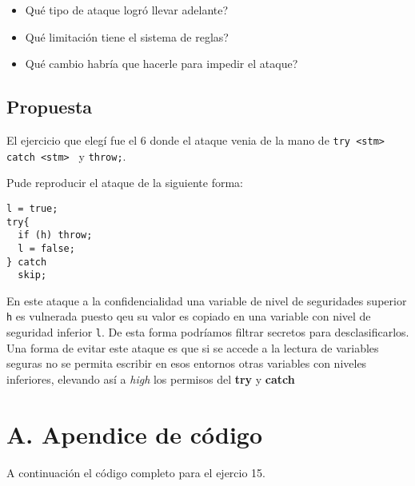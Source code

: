 \documentclass[11pt]{article}
\begin{document}
\begin{itemize}
    \item Qué tipo de ataque logró llevar adelante?
    \item Qué limitación tiene el sistema de reglas?
    \item Qué cambio habría que hacerle para impedir el ataque?
\end{itemize}

\subsection*{Propuesta}

El ejercicio que elegí fue el 6 donde el ataque venia de la mano de \texttt{try <stm> catch <stm> } y \texttt{throw;}.

Pude reproducir el ataque de la siguiente forma:

\begin{lstlisting}
l = true;
try{
  if (h) throw;
  l = false;
} catch
  skip;
\end{lstlisting}

En este ataque a la confidencialidad una variable de nivel de seguridades superior \texttt{h} es vulnerada puesto qeu su valor es copiado en una variable con nivel de seguridad inferior \texttt{l}. De esta forma podríamos filtrar secretos para desclasificarlos. Una forma de evitar este ataque es que si se accede a la lectura de variables seguras no se permita escribir en esos entornos otras variables con niveles inferiores, elevando así a \textit{high} los permisos del \textbf{try} y \textbf{catch}

\section*{A. Apendice de código}

A continuación el código completo para el ejercio 15.
\end{document}
